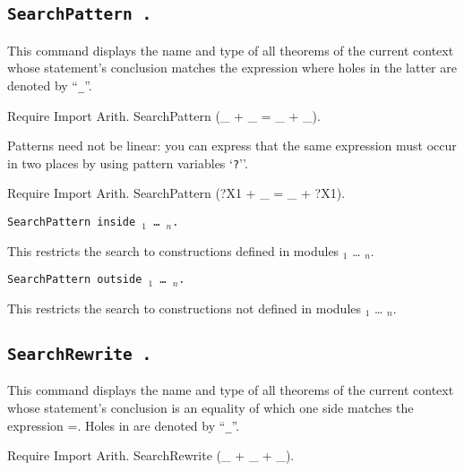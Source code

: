 \subsection{\tt SearchPattern {\term}.}

This command displays the name and type of all theorems of the current
context whose statement's conclusion matches the expression {\term}
where holes in the latter are denoted by ``{\texttt \_}''.

\begin{coq_example}
Require Import Arith.
SearchPattern (_ + _ = _ + _).
\end{coq_example}

Patterns need not be linear: you can express that the same expression
must occur in two places by using pattern variables `{\texttt
?{\ident}}''.

\begin{coq_example}
Require Import Arith.
SearchPattern (?X1 + _ = _ + ?X1).
\end{coq_example}

\begin{Variants}
\item {\tt SearchPattern {\term} inside
{\module$_1$} \ldots{} {\module$_n$}.}

This restricts the search to constructions defined in modules
{\module$_1$} \ldots{} {\module$_n$}.

\item {\tt SearchPattern {\term} outside {\module$_1$} \ldots{} {\module$_n$}.}

This restricts the search to constructions not defined in modules
{\module$_1$} \ldots{} {\module$_n$}.

\end{Variants}

\subsection{\tt SearchRewrite {\term}.}

This command displays the name and type of all theorems of the current
context whose statement's conclusion is an equality of which one side matches
the expression {\term =}. Holes in {\term} are denoted by ``{\texttt \_}''.

\begin{coq_example}
Require Import Arith.
SearchRewrite (_ + _ + _).
\end{coq_example}

